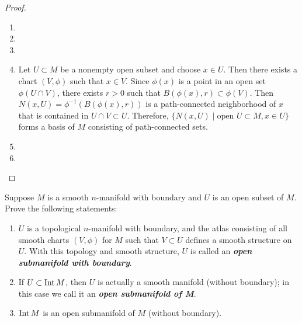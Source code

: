 \begin{proof}
  $ $
  \begin{enumerate}[label=(\alph*)]
    \item
    \item
    \item
    \item
      Let $U \subset M$ be a nonempty open subset and choose $x \in U$.
      Then there exists a chart $(V, \phi)$ such that $x \in V$.
      Since $\phi(x)$ is a point in an open set $\phi(U \cap V)$, there exists $r > 0$ such that $B(\phi(x), r) \subset \phi(V)$.
      Then $N(x, U) = \phi^{-1}(B(\phi(x), r))$ is a path-connected neighborhood of $x$ that is contained in $U \cap V \subset U$.
      Therefore, $\{ N(x, U) \mid \text{open } U \subset M, x \in U \}$ forms a basis of $M$ consisting of path-connected sets.
    \item
    \item
  \end{enumerate}
\end{proof}

\begin{customexer}{1.44}\label{exercise_1_44}
  Suppose $M$ is a smooth $n$-manifold with boundary and $U$ is an open subset of $M$.
  Prove the following statements:
  \begin{enumerate}[label=(\alph*)]
    \item
      $U$ is a topological $n$-manifold with boundary, and the atlas consisting of all smooth charts $(V, \phi)$ for $M$ such that $V \subset U$ defines a smooth structure on $U$.
      With this topology and smooth structure, $U$ is called an \textit{\textbf{open submanifold with boundary}}.
    \item
      If $U \subset \operatorname{Int} M$, then $U$ is actually a smooth manifold (without boundary); in this case we call it an \textit{\textbf{open submanifold of M}}.
    \item
      $\operatorname{Int} M$ is an open submanifold of $M$ (without boundary).
  \end{enumerate}
\end{customexer}

